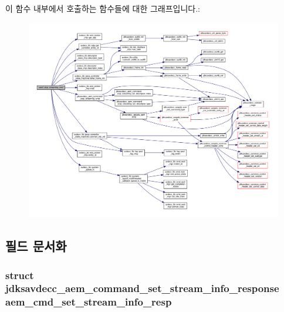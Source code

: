 이 함수 내부에서 호출하는 함수들에 대한 그래프입니다.\+:
\nopagebreak
\begin{figure}[H]
\begin{center}
\leavevmode
\includegraphics[width=350pt]{classavdecc__lib_1_1stream__output__descriptor__imp_a528a63dd6b8e71eb0cffcf5cb20936a2_cgraph}
\end{center}
\end{figure}




\subsection{필드 문서화}
\subsubsection[{\texorpdfstring{aem\+\_\+cmd\+\_\+set\+\_\+stream\+\_\+info\+\_\+resp}{aem_cmd_set_stream_info_resp}}]{\setlength{\rightskip}{0pt plus 5cm}struct {\bf jdksavdecc\+\_\+aem\+\_\+command\+\_\+set\+\_\+stream\+\_\+info\+\_\+response} aem\+\_\+cmd\+\_\+set\+\_\+stream\+\_\+info\+\_\+resp\hspace{0.3cm}{\ttfamily [private]}}\hypertarget{classavdecc__lib_1_1stream__output__descriptor__imp_aa222e1112a2252bbff62b2eb82d5faad}{}\label{classavdecc__lib_1_1stream__output__descriptor__imp_aa222e1112a2252bbff62b2eb82d5faad}


